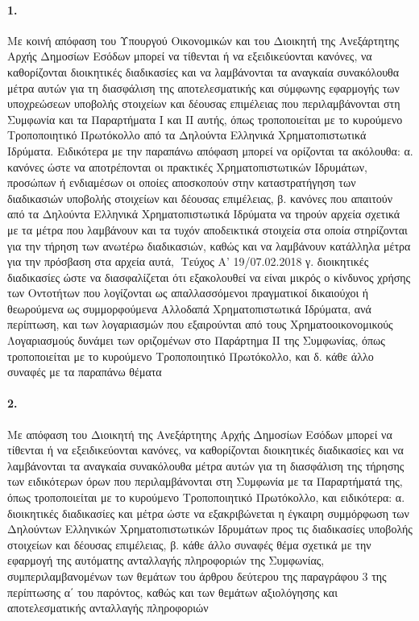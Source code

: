 \documentclass[a4paper,oneside, 10pt]{book}
\begin{document}
\paragraph { 1. } Με κοινή απόφαση του Υπουργού Οικονομικών και του Διοικητή της Ανεξάρτητης Αρχής Δημοσίων Εσόδων μπορεί να τίθενται ή να εξειδικεύονται κανόνες, να καθορίζονται διοικητικές διαδικασίες και να λαμβάνονται τα αναγκαία συνακόλουθα μέτρα αυτών για τη διασφάλιση της αποτελεσματικής και σύμφωνης εφαρμογής των υποχρεώσεων υποβολής στοιχείων και δέουσας επιμέλειας που περιλαμβάνονται στη Συμφωνία και τα Παραρτήματα Ι και ΙΙ αυτής, όπως τροποποιείται με το κυρούμενο Τροποποιητικό Πρωτόκολλο από τα Δηλούντα Ελληνικά Χρηματοπιστωτικά Ιδρύματα. Ειδικότερα με την παραπάνω απόφαση μπορεί να ορίζονται τα ακόλουθα:  α. κανόνες ώστε να αποτρέπονται οι πρακτικές Χρηματοπιστωτικών Ιδρυμάτων, προσώπων ή ενδιαμέσων οι οποίες αποσκοπούν στην καταστρατήγηση των διαδικασιών υποβολής στοιχείων και δέουσας επιμέλειας, β. κανόνες που απαιτούν από τα Δηλούντα Ελληνικά Χρηματοπιστωτικά Ιδρύματα να τηρούν αρχεία σχετικά με τα μέτρα που λαμβάνουν και τα τυχόν αποδεικτικά στοιχεία στα οποία στηρίζονται για την τήρηση των ανωτέρω διαδικασιών, καθώς και να λαμβάνουν κατάλληλα μέτρα για την πρόσβαση στα αρχεία αυτά,  Τεύχος Α’ 19/07.02.2018    γ. διοικητικές διαδικασίες ώστε να διασφαλίζεται ότι εξακολουθεί να είναι μικρός ο κίνδυνος χρήσης των Οντοτήτων που λογίζονται ως απαλλασσόμενοι πραγματικοί δικαιούχοι ή θεωρούμενα ως συμμορφούμενα Αλλοδαπά Χρηματοπιστωτικά Ιδρύματα, ανά περίπτωση, και των λογαριασμών που εξαιρούνται από τους Χρηματοοικονομικούς Λογαριασμούς δυνάμει των οριζομένων στο Παράρτημα ΙΙ της Συμφωνίας, όπως τροποποιείται με το κυρούμενο Τροποποιητικό Πρωτόκολλο, και  δ. κάθε άλλο συναφές με τα παραπάνω θέματα
\paragraph { 2. } Με απόφαση του Διοικητή της Ανεξάρτητης Αρχής Δημοσίων Εσόδων μπορεί να τίθενται ή να εξειδικεύονται κανόνες, να καθορίζονται διοικητικές διαδικασίες και να λαμβάνονται τα αναγκαία συνακόλουθα μέτρα αυτών για τη διασφάλιση της τήρησης των ειδικότερων όρων που περιλαμβάνονται στη Συμφωνία με τα Παραρτήματά της, όπως τροποποιείται με το κυρούμενο Τροποποιητικό Πρωτόκολλο, και ειδικότερα:  α. διοικητικές διαδικασίες και μέτρα ώστε να εξακριβώνεται η έγκαιρη συμμόρφωση των Δηλούντων Ελληνικών Χρηματοπιστωτικών Ιδρυμάτων προς τις διαδικασίες υποβολής στοιχείων και δέουσας επιμέλειας,  β. κάθε άλλο συναφές θέμα σχετικά με την εφαρμογή της αυτόματης ανταλλαγής πληροφοριών της Συμφωνίας, συμπεριλαμβανομένων των θεμάτων του άρθρου δεύτερου της παραγράφου 3 της περίπτωσης α΄ του παρόντος, καθώς και των θεμάτων αξιολόγησης και αποτελεσματικής ανταλλαγής πληροφοριών
\end{document}
